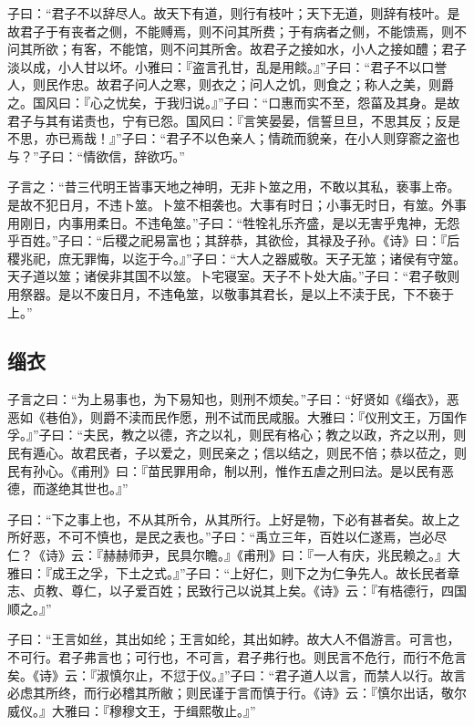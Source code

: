 \documentclass[]{article}
\begin{document}
子曰：``君子不以辞尽人。故天下有道，则行有枝叶；天下无道，则辞有枝叶。是故君子于有丧者之侧，不能赙焉，则不问其所费；于有病者之侧，不能馈焉，则不问其所欲；有客，不能馆，则不问其所舍。故君子之接如水，小人之接如醴；君子淡以成，小人甘以坏。小雅曰：『盗言孔甘，乱是用餤。』''子曰：``君子不以口誉人，则民作忠。故君子问人之寒，则衣之；问人之饥，则食之；称人之美，则爵之。国风曰：『心之忧矣，于我归说。』''子曰：``口惠而实不至，怨菑及其身。是故君子与其有诺责也，宁有已怨。国风曰：『言笑晏晏，信誓旦旦，不思其反；反是不思，亦已焉哉！』''子曰：``君子不以色亲人；情疏而貌亲，在小人则穿窬之盗也与？''子曰：``情欲信，辞欲巧。''

子言之：``昔三代明王皆事天地之神明，无非卜筮之用，不敢以其私，亵事上帝。是故不犯日月，不违卜筮。卜筮不相袭也。大事有时日；小事无时日，有筮。外事用刚日，内事用柔日。不违龟筮。''子曰：``牲牷礼乐齐盛，是以无害乎鬼神，无怨乎百姓。''子曰：``后稷之祀易富也；其辞恭，其欲俭，其禄及子孙。《诗》曰：『后稷兆祀，庶无罪悔，以迄于今。』''子曰：``大人之器威敬。天子无筮；诸侯有守筮。天子道以筮；诸侯非其国不以筮。卜宅寝室。天子不卜处大庙。''子曰：``君子敬则用祭器。是以不废日月，不违龟筮，以敬事其君长，是以上不渎于民，下不亵于上。''

\hypertarget{header-n755}{%
\subsection{缁衣}\label{header-n755}}

子言之曰：``为上易事也，为下易知也，则刑不烦矣。''子曰：``好贤如《缁衣》，恶恶如《巷伯》，则爵不渎而民作愿，刑不试而民咸服。大雅曰：『仪刑文王，万国作孚。』''子曰：``夫民，教之以德，齐之以礼，则民有格心；教之以政，齐之以刑，则民有遁心。故君民者，子以爱之，则民亲之；信以结之，则民不倍；恭以莅之，则民有孙心。《甫刑》曰：『苗民罪用命，制以刑，惟作五虐之刑曰法。是以民有恶德，而遂绝其世也。』''

子曰：``下之事上也，不从其所令，从其所行。上好是物，下必有甚者矣。故上之所好恶，不可不慎也，是民之表也。''子曰：``禹立三年，百姓以仁遂焉，岂必尽仁？《诗》云：『赫赫师尹，民具尔瞻。』《甫刑》曰：『一人有庆，兆民赖之。』大雅曰：『成王之孚，下土之式。』''子曰：``上好仁，则下之为仁争先人。故长民者章志、贞教、尊仁，以子爱百姓；民致行己以说其上矣。《诗》云：『有梏德行，四国顺之。』''

子曰：``王言如丝，其出如纶；王言如纶，其出如綍。故大人不倡游言。可言也，不可行。君子弗言也；可行也，不可言，君子弗行也。则民言不危行，而行不危言矣。《诗》云：『淑慎尔止，不愆于仪。』''子曰：``君子道人以言，而禁人以行。故言必虑其所终，而行必稽其所敝；则民谨于言而慎于行。《诗》云：『慎尔出话，敬尔威仪。』大雅曰：『穆穆文王，于缉熙敬止。』''
\end{document}
